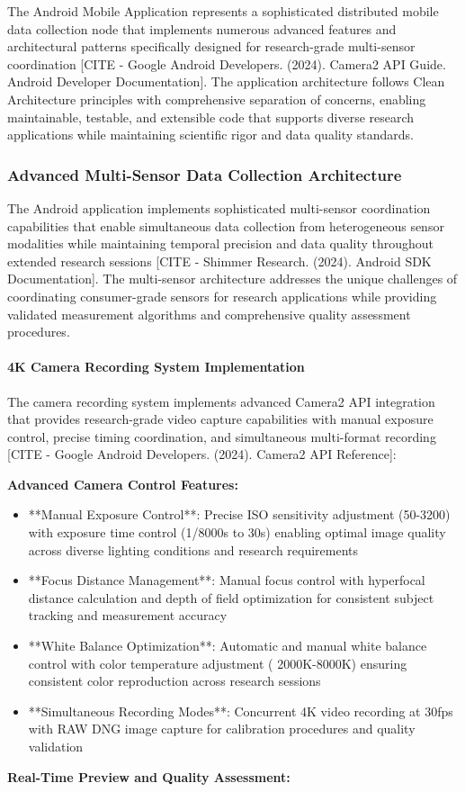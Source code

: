 \documentclass[11pt,a4paper]{report}
\begin{document}
The Android Mobile Application represents a sophisticated distributed mobile data collection node that implements
numerous advanced features and architectural patterns specifically designed for research-grade multi-sensor
coordination [CITE - Google Android Developers. (2024). Camera2 API Guide. Android Developer Documentation]. The
application architecture follows Clean Architecture principles with comprehensive separation of concerns, enabling
maintainable, testable, and extensible code that supports diverse research applications while maintaining scientific
rigor and data quality standards.

\subsubsection{Advanced Multi-Sensor Data Collection Architecture}

The Android application implements sophisticated multi-sensor coordination capabilities that enable simultaneous data
collection from heterogeneous sensor modalities while maintaining temporal precision and data quality throughout
extended research sessions [CITE - Shimmer Research. (2024). Android SDK Documentation]. The multi-sensor architecture
addresses the unique challenges of coordinating consumer-grade sensors for research applications while providing
validated measurement algorithms and comprehensive quality assessment procedures.

\paragraph{4K Camera Recording System Implementation}

The camera recording system implements advanced Camera2 API integration that provides research-grade video capture
capabilities with manual exposure control, precise timing coordination, and simultaneous multi-format
recording [CITE - Google Android Developers. (2024). Camera2 API Reference]:

\textbf{Advanced Camera Control Features:}

\begin{itemize}
\item **Manual Exposure Control**: Precise ISO sensitivity adjustment (50-3200) with exposure time control (1/8000s to 30s)
  enabling optimal image quality across diverse lighting conditions and research requirements
\item **Focus Distance Management**: Manual focus control with hyperfocal distance calculation and depth of field
  optimization for consistent subject tracking and measurement accuracy
\item **White Balance Optimization**: Automatic and manual white balance control with color temperature adjustment (
  2000K-8000K) ensuring consistent color reproduction across research sessions
\item **Simultaneous Recording Modes**: Concurrent 4K video recording at 30fps with RAW DNG image capture for calibration
  procedures and quality validation

\end{itemize}
\textbf{Real-Time Preview and Quality Assessment:}
\end{document}
